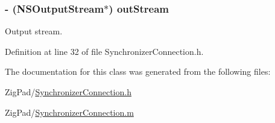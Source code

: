 \hypertarget{interface_synchronizer_connection_a40bb251ce886c4b07fe1c1e4c5107eeb}{
\subsubsection[{outStream}]{\setlength{\rightskip}{0pt plus 5cm}-\/ (NSOutputStream$\ast$) outStream}}
\label{interface_synchronizer_connection_a40bb251ce886c4b07fe1c1e4c5107eeb}
Output stream. 

Definition at line 32 of file SynchronizerConnection.h.



The documentation for this class was generated from the following files:\begin{DoxyCompactItemize}
\item 
ZigPad/\hyperlink{_synchronizer_connection_8h}{SynchronizerConnection.h}\item 
ZigPad/\hyperlink{_synchronizer_connection_8m}{SynchronizerConnection.m}\end{DoxyCompactItemize}
